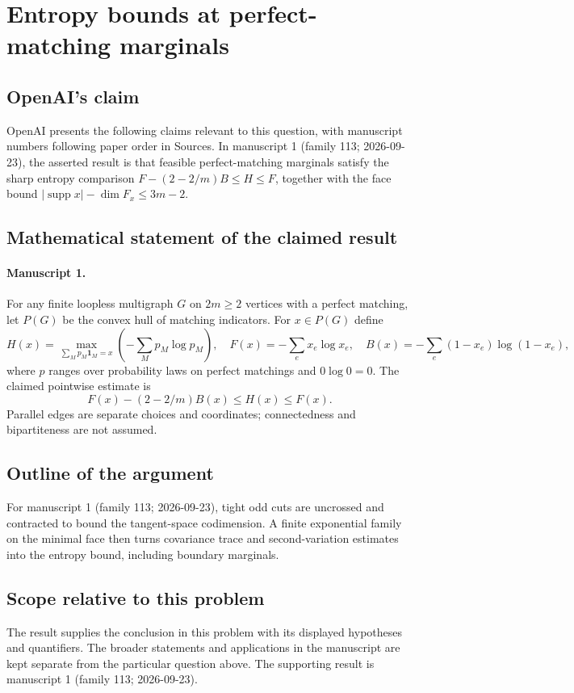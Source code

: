 \documentclass[11pt]{article}
\begin{document}
\section*{Entropy bounds at perfect-matching marginals}

\subsection{OpenAI's claim}
OpenAI presents the following claims relevant to this question, with manuscript numbers following paper order in Sources. In manuscript 1 (family 113; 2026-09-23), the asserted result is that feasible perfect-matching marginals satisfy the sharp entropy comparison $F-(2-2/m)B\le H\le F$, together with the face bound $|\operatorname{supp}x|-\dim F_x\le3m-2$.

\subsection{Mathematical statement of the claimed result}
\paragraph{Manuscript 1.}
For any finite loopless multigraph $G$ on $2m\ge2$ vertices with a perfect matching, let $P(G)$ be the convex hull of matching indicators. For $x\in P(G)$ define
\[
 H(x)=\max_{\sum_Mp_M\mathbf1_M=x}(-\sum_Mp_M\log p_M),\quad
 F(x)=-\sum_ex_e\log x_e,\quad B(x)=-\sum_e(1-x_e)\log(1-x_e),
\]
where $p$ ranges over probability laws on perfect matchings and $0\log0=0$. The claimed pointwise estimate is
\[
 F(x)-(2-2/m)B(x)\le H(x)\le F(x).
\]
Parallel edges are separate choices and coordinates; connectedness and bipartiteness are not assumed.

\subsection{Outline of the argument}
For manuscript 1 (family 113; 2026-09-23), tight odd cuts are uncrossed and contracted to bound the tangent-space codimension. A finite exponential family on the minimal face then turns covariance trace and second-variation estimates into the entropy bound, including boundary marginals.

\subsection{Scope relative to this problem}
The result supplies the conclusion in this problem with its displayed hypotheses and quantifiers. The broader statements and applications in the manuscript are kept separate from the particular question above. The supporting result is manuscript 1 (family 113; 2026-09-23).
\end{document}
